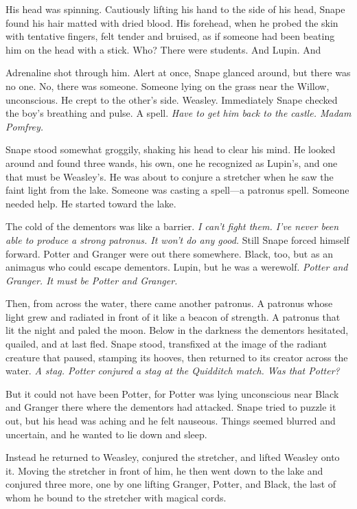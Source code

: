 His head was spinning. Cautiously lifting his hand to the side of his head, Snape found his hair matted with dried blood. His forehead, when he probed the skin with tentative fingers, felt tender and bruised, as if someone had been beating him on the head with a stick. Who? There were students. And Lupin. And{\el}

Adrenaline shot through him. Alert at once, Snape glanced around, but there was no one. No, there was someone. Someone lying on the grass near the Willow, unconscious. He crept to the other's side. Weasley. Immediately Snape checked the boy's breathing and pulse. A spell. \emph{Have to get him back to the castle. Madam Pomfrey.}

Snape stood somewhat groggily, shaking his head to clear his mind. He looked around and found three wands, his own, one he recognized as Lupin's, and one that must be Weasley's. He was about to conjure a stretcher when he saw the faint light from the lake. Someone was casting a spell—a patronus spell. Someone needed help. He started toward the lake.

The cold of the dementors was like a barrier. \emph{I can't fight them. I've never been able to produce a strong patronus. It won't do any good.} Still Snape forced himself forward. Potter and Granger were out there somewhere. Black, too, but as an animagus who could escape dementors. Lupin, but he was a werewolf. \emph{Potter and Granger. It must be Potter and Granger.}

Then, from across the water, there came another patronus. A patronus whose light grew and radiated in front of it like a beacon of strength. A patronus that lit the night and paled the moon. Below in the darkness the dementors hesitated, quailed, and at last fled. Snape stood, transfixed at the image of the radiant creature that paused, stamping its hooves, then returned to its creator across the water. \emph{A stag. Potter conjured a stag at the Quidditch match. Was that Potter?}

But it could not have been Potter, for Potter was lying unconscious near Black and Granger there where the dementors had attacked. Snape tried to puzzle it out, but his head was aching and he felt nauseous. Things seemed blurred and uncertain, and he wanted to lie down and sleep.

Instead he returned to Weasley, conjured the stretcher, and lifted Weasley onto it. Moving the stretcher in front of him, he then went down to the lake and conjured three more, one by one lifting Granger, Potter, and Black, the last of whom he bound to the stretcher with magical cords.

